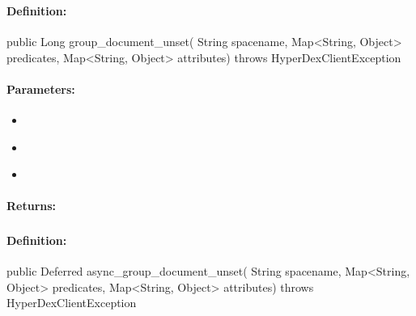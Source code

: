 \pagebreak
\subsubsection{}
\label{api:java:group_document_unset}


\paragraph{Definition:}
\begin{javacode}
public Long group_document_unset(
        String spacename,
        Map<String, Object> predicates,
        Map<String, Object> attributes) throws HyperDexClientException
\end{javacode}

\paragraph{Parameters:}
\begin{itemize}[noitemsep]
\item {}\\

\item {}\\

\item {}\\

\end{itemize}

\paragraph{Returns:}


\pagebreak
\subsubsection{}
\label{api:java:async_group_document_unset}


\paragraph{Definition:}
\begin{javacode}
public Deferred async_group_document_unset(
        String spacename,
        Map<String, Object> predicates,
        Map<String, Object> attributes) throws HyperDexClientException
\end{javacode}

